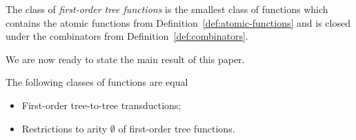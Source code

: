 \begin{definition} \label{def:fo-tree-functions} The class of \emph{first-order tree functions} is the smallest class of functions which contains the atomic functions from Definition~\ref{def:atomic-functions} and is closed under the combinators from Definition~\ref{def:combinators}.
\end{definition}


We are now ready to state the main result of this paper. 
\begin{theorem}
    The following classes of functions are equal\begin{itemize}
        \item First-order tree-to-tree transductions;
        \item Restrictions to arity $\emptyset$ of first-order tree functions.
    \end{itemize}
\end{theorem}
